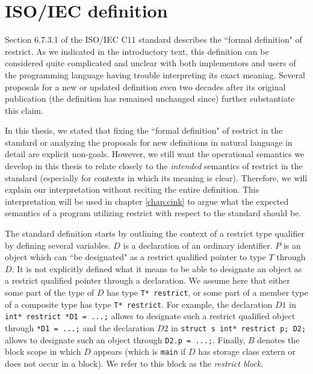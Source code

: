\section{ISO/IEC definition}\label{section:iso-definition}
Section 6.7.3.1 of the ISO/IEC C11 standard \cite{ISO:2018:III} describes the ``formal definition" of restrict.
As we indicated in the introductory text, this definition can be considered quite complicated and unclear
with both implementors and users of the programming language having trouble interpreting its exact meaning.
Several proposals for a new or updated definition \cite{johnsonclarifying2018, provmacdonald2022, defectr2macdonald2024, semanticsgustedt2024}
even two decades after its original publication (the definition has remained unchanged since) further substantiate this claim.

In this thesis, we stated that fixing the ``formal definition" of restrict in the standard or analyzing the proposals for 
new definitions in natural language in detail are explicit non-goals.
However, we still want the operational semantics we develop in this thesis to relate closely to the \textit{intended}
semantics of restrict in the standard (especially for contexts in which its meaning is clear).
Therefore, we will explain our interpretation without reciting the entire definition.
This interpretation will be used in chapter \ref{chap:cink} to argue what the expected semantics of a program 
utilizing restrict with respect to the standard should be.

The standard definition starts by outlining the context of a restrict type qualifier by defining several variables.
$D$ is a declaration of an ordinary identifier.
$P$ is an object which can ``be designated" as a restrict qualified pointer to type $T$ through $D$.
It is not explicitly defined what it means to be able to designate an object as a restrict qualified pointer through a declaration.
We assume here that either some part of the type of $D$ has type \texttt{T* restrict}, or some part of a member type of 
a composite type has type \texttt{T* restrict}.
For example, the declaration $D1$ in \texttt{int* restrict *D1 = ...;} allows to designate such a restrict qualified object through \texttt{*D1 = ...;}
and the declaration $D2$ in \texttt{struct s {int* restrict p;} D2;} allows to designate such an object through \texttt{D2.p = ...;}.
Finally, $B$ denotes the block scope in which $D$ appears (which is \texttt{main} if $D$ has storage class extern or does not occur in a block).
We refer to this block as the \textit{restrict block}.

